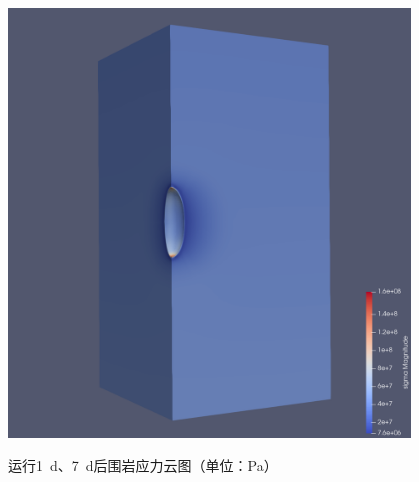 \begin{figure}[ht!]
{\begin{minipage}{7cm}
            \includegraphics[width=0.95\textwidth]{img/chap5/7d应力云图.png}
        \end{minipage}
        \label{fig：sigma7d}
    }
    \caption{运行\SI{1}{d}、\SI{7}{d}后围岩应力云图（单位：Pa）}
    \label{fig:sigma}
\end{figure}

